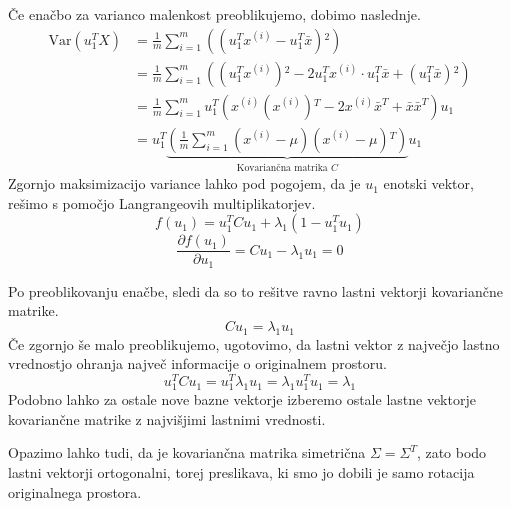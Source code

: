 Če enačbo za varianco malenkost preoblikujemo, dobimo naslednje.~\cite{zupan2024uozp}
\begin{equation}
\begin{aligned}
\mathrm{Var}(u_1^T X) 
&= \frac{1}{m} \sum_{i=1}^{m} \left( (u_1^T x^{(i)} - u_1^T \bar{x}){}^2 \right) \\
&= \frac{1}{m} \sum_{i=1}^{m} \left( (u_1^T x^{(i)}){}^2 - 2 u_1^T x^{(i)} \cdot u_1^T \bar{x} + (u_1^T \bar{x}){}^2 \right) \\
&= \frac{1}{m} \sum_{i=1}^{m} u_1^T \left( x^{(i)} (x^{(i)}){}^T - 2 x^{(i)} \bar{x}^T + \bar{x} \bar{x}^T \right) u_1 \\
&= u_1^T \underbrace{\left( \frac{1}{m} \sum_{i=1}^{m} (x^{(i)} - \mu)(x^{(i)} - \mu){}^T \right)}_{\text{Kovariančna matrika } C} u_1
\end{aligned}
\end{equation}
Zgornjo maksimizacijo variance lahko pod pogojem, da je $u_1$ enotski vektor, rešimo s pomočjo Langrangeovih multiplikatorjev.
\begin{equation}
f(u_1) = u_1^T C u_1 + \lambda_1 (1 - u_1^T u_1)
\end{equation}
\begin{equation}
\frac{\partial f(u_1)}{\partial u_1} = C u_1 - \lambda_1 u_1 = 0
\end{equation}

Po preoblikovanju enačbe, sledi da so to rešitve ravno lastni vektorji kovariančne matrike.
\begin{equation}
C u_1 = \lambda_1 u_1
\end{equation}
Če zgornjo še malo preoblikujemo, ugotovimo, da lastni vektor z največjo lastno vrednostjo ohranja največ informacije o originalnem prostoru.
\begin{equation}
    u_1^T C u_1 = u_1^T \lambda_1 u_1 = \lambda_1 u_1^T u_1 = \lambda_1
\end{equation}
Podobno lahko za ostale nove bazne vektorje izberemo ostale lastne vektorje kovariančne matrike z najvišjimi lastnimi vrednosti.

Opazimo lahko tudi, da je kovariančna matrika simetrična $\Sigma = \Sigma^T$, zato bodo lastni vektorji ortogonalni, torej preslikava, ki smo jo dobili je samo rotacija originalnega prostora.

